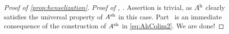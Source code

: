\begin{proof}[Proof of \cref{prop:henselization}]
	\emph{Proof of , .} Assertion  is trivial, as $A^{\mathrm{h}}$ clearly satisfies the universal property of $A^{\mathrm{sh}}$ in this case. Part~ is an immediate consequence of the construction of $A^{\mathrm{sh}}$ in \cref{eq:AhColim2}. We are done!
\end{proof}